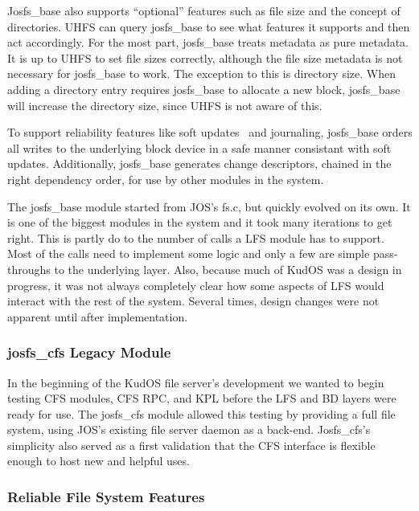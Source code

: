 Josfs\_base also supports ``optional'' features such as file size and the
concept of directories. UHFS can query josfs\_base to see what features it
supports and then act accordingly. For the most part, josfs\_base treats
metadata as pure metadata. It is up to UHFS to set file sizes correctly,
although the file size metadata is not necessary for josfs\_base to work. The
exception to this is directory size. When adding a directory entry requires
josfs\_base to allocate a new block, josfs\_base will increase the directory
size, since UHFS is not aware of this.

To support reliability features like soft updates~\cite{ganger00soft} and
journaling, josfs\_base orders all writes to the underlying block device in a
safe manner consistant with soft updates. Additionally, josfs\_base generates
change descriptors, chained in the right dependency order, for use by other
modules in the system.

The josfs\_base module started from JOS's fs.c, but quickly evolved on its own.
It is one of the biggest modules in the system and it took many iterations to
get right. This is partly do to the number of calls a LFS module has to support.
Most of the calls need to implement some logic and only a few are simple
pass-throughs to the underlying layer. Also, because much of KudOS was a design
in progress, it was not always completely clear how some aspects of LFS would
interact with the rest of the system. Several times, design changes were not
apparent until after implementation.

\subsubsection{josfs\_cfs Legacy Module}
\label{sec:solution:impl:legacy}

In the beginning of the KudOS file server's development we wanted to begin
testing CFS modules, CFS RPC, and KPL before the LFS and BD layers were ready
for use. The josfs\_cfs module allowed this testing by providing a full file
system, using JOS's existing file server daemon as a back-end. Josfs\_cfs's
simplicity also served as a first validation that the CFS interface is flexible
enough to host new and helpful uses.

\subsubsection{Reliable File System Features}
\label{sec:solution:impl:reliable}

